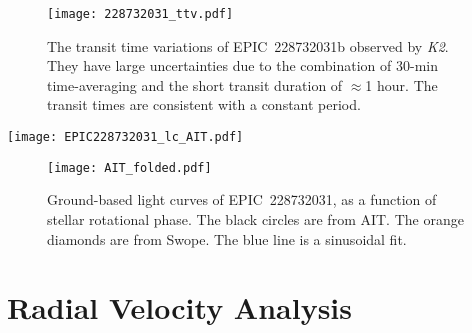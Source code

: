 \documentclass[twocolumn]{aastex61}
\begin{document}
\begin{figure}
\begin{center}
\texttt{[image: 228732031\_ttv.pdf]}
\caption{The transit time variations of EPIC~228732031b observed by {\it K2}. They have large uncertainties due to the combination of 30-min time-averaging and the short transit duration of $\approx$1 hour. The transit times are consistent with a constant period.}
\label{ttv}
\end{center}
\end{figure}

\begin{figure*}
\begin{center}
\texttt{[image: EPIC228732031\_lc\_AIT.pdf]}
\caption{Ground-based light curve of EPIC~228732031. The black circles are observed fluxes from AIT. The orange diamonds are observed fluxes from Swope. The light curve shows a rotational modulation with similar periodicity as the {\it K2} light curve (See Fig. \ref{ground_folded}). The green curve shows the Gaussian Process regression of the light curve with the same quasi-periodic kernel as in Fig. \ref{fig:K2_lc}. The blue shaded region is the 1$\sigma$ confidence interval of the Gaussian Process.}
\label{AIT}
\end{center}
\end{figure*}

\begin{figure}
\begin{center}
\texttt{[image: AIT\_folded.pdf]}
\caption{Ground-based light curves of EPIC~228732031, as a function of stellar rotational phase. The black circles are from AIT. The orange diamonds are from Swope. The blue line is a sinusoidal fit.}
\label{ground_folded}
\end{center}
\end{figure}

\section{Radial Velocity Analysis}\label{rv_analysis}
\end{document}
